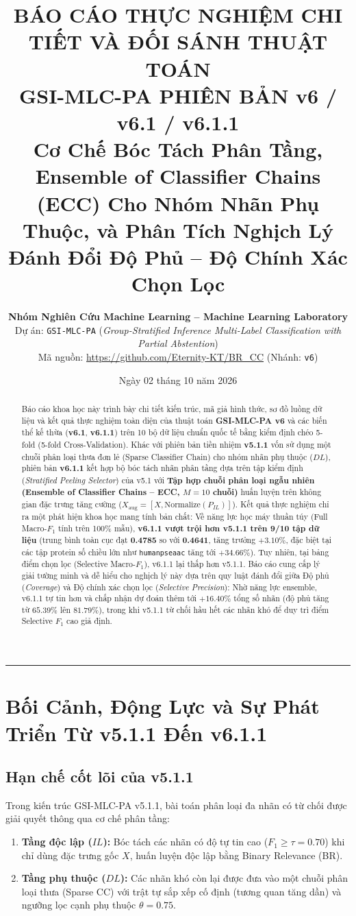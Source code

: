 \documentclass[11pt,a4paper]{article}
\title{\textbf{\LARGE BÁO CÁO THỰC NGHIỆM CHI TIẾT VÀ ĐỐI SÁNH THUẬT TOÁN\\ GSI-MLC-PA PHIÊN BẢN v6 / v6.1 / v6.1.1}\\[0.5em]
\Large Cơ Chế Bóc Tách Phân Tầng, Ensemble of Classifier Chains (ECC) Cho Nhóm Nhãn Phụ Thuộc, và Phân Tích Nghịch Lý Đánh Đổi Độ Phủ -- Độ Chính Xác Chọn Lọc}
\author{\textbf{Nhóm Nghiên Cứu Machine Learning -- Machine Learning Laboratory}\\
Dự án: \texttt{GSI-MLC-PA} (\textit{Group-Stratified Inference Multi-Label Classification with Partial Abstention})\\
Mã nguồn: \url{https://github.com/Eternity-KT/BR_CC} (Nhánh: \texttt{v6})}
\date{Ngày 02 tháng 10 năm 2026}
\begin{document}
\maketitle

\begin{abstract}
Báo cáo khoa học này trình bày chi tiết kiến trúc, mã giả hình thức, sơ đồ luồng dữ liệu và kết quả thực nghiệm toàn diện của thuật toán \textbf{GSI-MLC-PA v6} và các biến thể kế thừa (\textbf{v6.1}, \textbf{v6.1.1}) trên 10 bộ dữ liệu chuẩn quốc tế bằng kiểm định chéo 5-fold (5-fold Cross-Validation). Khác với phiên bản tiền nhiệm \textbf{v5.1.1} vốn sử dụng một chuỗi phân loại thưa đơn lẻ (Sparse Classifier Chain) cho nhóm nhãn phụ thuộc ($DL$), phiên bản \textbf{v6.1.1} kết hợp bộ bóc tách nhãn phân tầng dựa trên tập kiểm định (\textit{Stratified Peeling Selector}) của v5.1 với \textbf{Tập hợp chuỗi phân loại ngẫu nhiên (Ensemble of Classifier Chains -- ECC, $M=10$ chuỗi)} huấn luyện trên không gian đặc trưng tăng cường ($X_{\text{aug}} = [X, \text{Normalize}(P_{IL})]$). Kết quả thực nghiệm chỉ ra một phát hiện khoa học mang tính bản chất: Về năng lực học máy thuần túy (Full Macro-$F_1$ tính trên 100\% mẫu), \textbf{v6.1.1 vượt trội hơn v5.1.1 trên 9/10 tập dữ liệu} (trung bình toàn cục đạt \textbf{0.4785} so với \textbf{0.4641}, tăng trưởng $+3.10\%$, đặc biệt tại các tập protein số chiều lớn như \texttt{humanpseaac} tăng tới $+34.66\%$). Tuy nhiên, tại bảng điểm chọn lọc (Selective Macro-$F_1$), v6.1.1 lại thấp hơn v5.1.1. Báo cáo cung cấp lý giải tường minh và dễ hiểu cho nghịch lý này dựa trên quy luật đánh đổi giữa Độ phủ (\textit{Coverage}) và Độ chính xác chọn lọc (\textit{Selective Precision}): Nhờ năng lực ensemble, v6.1.1 tự tin hơn và chấp nhận dự đoán thêm tới $+16.40\%$ tổng số nhãn (độ phủ tăng từ $65.39\%$ lên $81.79\%$), trong khi v5.1.1 từ chối hầu hết các nhãn khó để duy trì điểm Selective $F_1$ cao giả định.
\end{abstract}

\vspace{0.8em}
\hrule
\vspace{1.2em}

\section{Bối Cảnh, Động Lực và Sự Phát Triển Từ v5.1.1 Đến v6.1.1}

\subsection{Hạn chế cốt lõi của v5.1.1}
Trong kiến trúc GSI-MLC-PA v5.1.1, bài toán phân loại đa nhãn có từ chối được giải quyết thông qua cơ chế phân tầng:
\begin{enumerate}
    \item \textbf{Tầng độc lập ($IL$):} Bóc tách các nhãn có độ tự tin cao ($F_1 \ge \tau = 0.70$) khi chỉ dùng đặc trưng gốc $X$, huấn luyện độc lập bằng Binary Relevance (BR).
    \item \textbf{Tầng phụ thuộc ($DL$):} Các nhãn khó còn lại được đưa vào một chuỗi phân loại thưa (Sparse CC) với trật tự sắp xếp cố định (tương quan tăng dần) và ngưỡng lọc cạnh phụ thuộc $\theta = 0.75$.
\end{enumerate}
\end{document}
